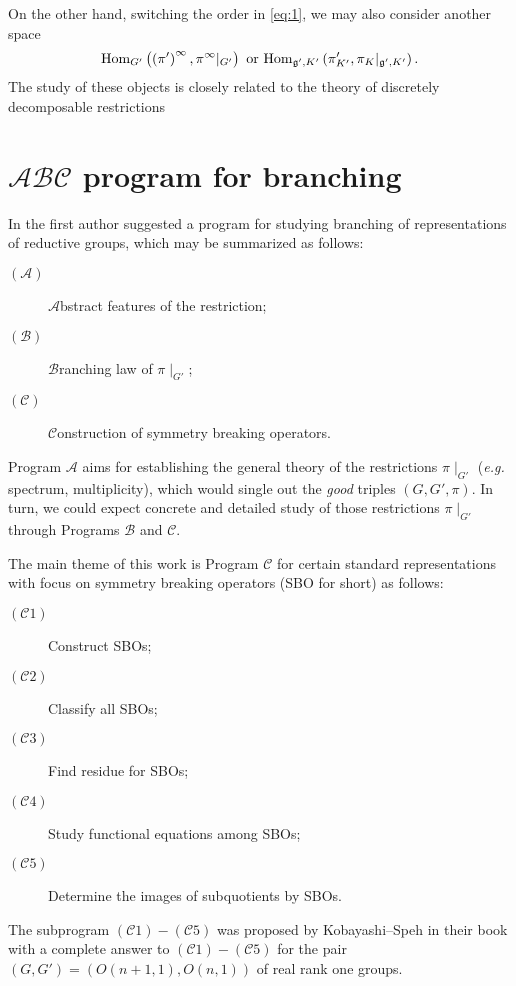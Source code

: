 \documentclass[10pt]{article} %
\newcommand{\Hom}{\mbox{\normalfont Hom}}
\theoremstyle{definition}
\begin{document}
On the other hand, switching the order in \eqref{eq:1}, we may also consider another space
\begin{equation*}
	\Hom_{G'}\left( \left( \pi' \right)^\infty,\pi^\infty\kern-0.1cm\mid_{G'} \right)\mbox{ or }\Hom_{\mathfrak{g}',K'}\left( \pi_{K'}',\pi_{K}\kern-0.1cm\mid_{\mathfrak{g}',K'} \right).
\end{equation*}
The study of these objects is closely related to the theory of discretely decomposable restrictions \cite{kobayashi1998discrete2,kobayashi1998discrete3}

\section{$\mathcal{A}\mathcal{B}\mathcal{C}$ program for branching}

In {\cite{kobayashi2015program}} the first author suggested a program
for studying branching of representations of reductive groups, which may be summarized
as follows:
\begin{description}
  \item[$(\mathcal{A})$] $\mathcal{A}$bstract features of the restriction;
  
  \item[$(\mathcal{B})$] $\mathcal{B}$ranching law of $\pi\!\mid_{G'}$;
  
  \item[$(\mathcal{C})$] $\mathcal{C}$onstruction of symmetry breaking operators.
\end{description}
Program $\mathcal{A}$ aims for establishing the general theory of the restrictions $\pi\!\mid_{G'}$
({\it e.g.} spectrum, multiplicity), which would single out the {\it good} triples $\left( G,G',\pi \right)$. In turn, we could expect concrete and detailed study of those restrictions
$\pi\!\mid_{G'}$ through Programs $\mathcal{B}$ and $\mathcal{C}$.

The main theme of this work is Program ${\mathcal{C}}$ for certain standard
representations with focus on symmetry breaking operators (SBO for short) as follows:
\begin{description}
  \item[$(\mathcal{C}1)$] Construct SBOs;
  \item[$(\mathcal{C}2)$] Classify all SBOs;
  \item[$(\mathcal{C}3)$] Find residue  for SBOs;
  \item[$(\mathcal{C}4)$] Study functional equations among SBOs;
  \item[$(\mathcal{C}5)$] Determine the images of subquotients by SBOs.
\end{description}
The subprogram $(\mathcal{C}1) - (\mathcal{C}5)$ was proposed by
Kobayashi--Speh in their book {\cite{kobayashi2015symmetry}} with
a complete answer to $(\mathcal{C}1) - (\mathcal{C}5)$ for the
pair $(G, G') = (O (n + 1, 1), O (n, 1))$ of real rank one groups.
\end{document}
